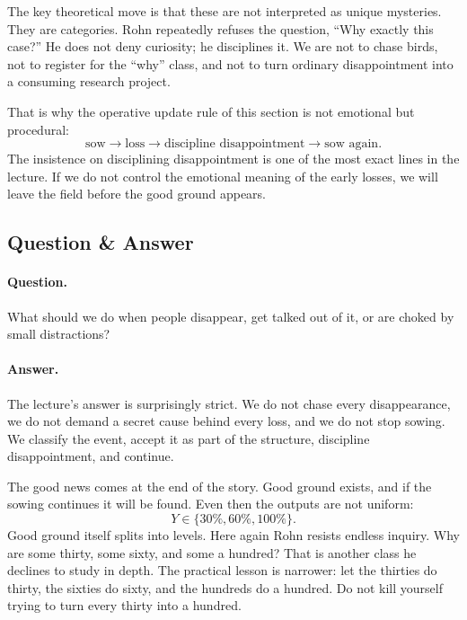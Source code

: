 The key theoretical move is that these are not interpreted as unique mysteries. They are categories. Rohn repeatedly refuses the question, ``Why exactly this case?'' He does not deny curiosity; he disciplines it. We are not to chase birds, not to register for the ``why'' class, and not to turn ordinary disappointment into a consuming research project.

That is why the operative update rule of this section is not emotional but procedural:
\begin{equation}
\text{sow}
\longrightarrow
\text{loss}
\longrightarrow
\text{discipline disappointment}
\longrightarrow
\text{sow again}.
\end{equation}
The insistence on disciplining disappointment is one of the most exact lines in the lecture. If we do not control the emotional meaning of the early losses, we will leave the field before the good ground appears.

\subsection{Question \& Answer}

\paragraph{Question.} What should we do when people disappear, get talked out of it, or are choked by small distractions?

\paragraph{Answer.} The lecture's answer is surprisingly strict. We do not chase every disappearance, we do not demand a secret cause behind every loss, and we do not stop sowing. We classify the event, accept it as part of the structure, discipline disappointment, and continue.

The good news comes at the end of the story. Good ground exists, and if the sowing continues it will be found. Even then the outputs are not uniform:
\begin{equation}
Y \in \{30\%,60\%,100\%\}.
\end{equation}
Good ground itself splits into levels. Here again Rohn resists endless inquiry. Why are some thirty, some sixty, and some a hundred? That is another class he declines to study in depth. The practical lesson is narrower: let the thirties do thirty, the sixties do sixty, and the hundreds do a hundred. Do not kill yourself trying to turn every thirty into a hundred.

